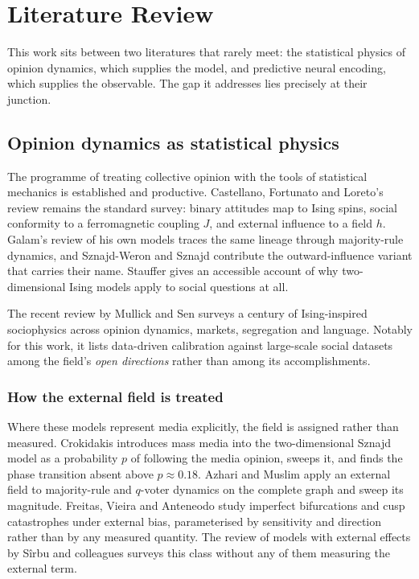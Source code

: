 \chapter{Literature Review}
\label{ch:literature}

This work sits between two literatures that rarely meet: the statistical physics of opinion
dynamics, which supplies the model, and predictive neural encoding, which supplies the
observable. The gap it addresses lies precisely at their junction.

\section{Opinion dynamics as statistical physics}

The programme of treating collective opinion with the tools of statistical mechanics is
established and productive. Castellano, Fortunato and Loreto's review \cite{castellano2009}
remains the standard survey: binary attitudes map to Ising spins, social conformity to a
ferromagnetic coupling $J$, and external influence to a field $h$. Galam's review of his own
models \cite{galam2008} traces the same lineage through majority-rule dynamics, and
Sznajd-Weron and Sznajd \cite{sznajd2000} contribute the outward-influence variant that
carries their name. Stauffer \cite{stauffer2008} gives an accessible account of why
two-dimensional Ising models apply to social questions at all.

The recent review by Mullick and Sen \cite{mullick2025} surveys a century of Ising-inspired
sociophysics across opinion dynamics, markets, segregation and language. Notably for this
work, it lists data-driven calibration against large-scale social datasets among the field's
\emph{open directions} rather than among its accomplishments.

\subsection{How the external field is treated}

Where these models represent media explicitly, the field is assigned rather than measured.
Crokidakis \cite{crokidakis2012} introduces mass media into the two-dimensional Sznajd model
as a probability $p$ of following the media opinion, sweeps it, and finds the phase transition
absent above $p \approx 0.18$. Azhari and Muslim \cite{azhari2023} apply an external field to
majority-rule and $q$-voter dynamics on the complete graph and sweep its magnitude. Freitas,
Vieira and Anteneodo \cite{freitas2020} study imperfect bifurcations and cusp catastrophes
under external bias, parameterised by sensitivity and direction rather than by any measured
quantity. The review of models with external effects by S\^{i}rbu and colleagues
\cite{sirbu2016} surveys this class without any of them measuring the external term.

